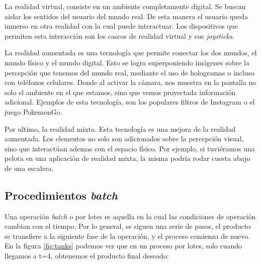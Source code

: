 
La realidad virtual, consiste en un ambiente completamente digital. Se buscan aislar los sentidos del usuario del mundo real. De esta manera el usuario queda inmerso en otra realidad con la cual puede interactuar. Los dispositivos que permiten esta interacción son los cascos de realidad virtual y sus \textit{joysticks}.

La realidad aumentada es una tecnología que permite conectar los dos mundos, el mundo físico y el mundo digital. Esto se logra superponiendo imágenes sobre la percepción que tenemos del mundo real, mediante el uso de hologramas o incluso con teléfonos celulares. Donde al activar la cámara, nos muestra en la pantalla no solo el ambiente en el que estamos, sino que vemos proyectada información adicional. Ejemplos de esta tecnología, son los populares filtros de Instagram o el juego PokemonGo.

Por ultimo, la realidad mixta. Esta tecnología es una mejora de la realidad aumentada. Los elementos no solo son adicionados sobre la percepción visual, sino que interactúan ademas con el espacio físico. Por ejemplo, si tuviéramos una pelota en una aplicación de realidad mixta, la misma podría rodar cuesta abajo de una escalera.


\subsection{Procedimientos \textit{batch}}

Una operación \textit{batch} o por lotes es aquella en la cual las condiciones de operación cambian con el tiempo. Por lo general, se siguen una serie de pasos, el producto se transfiere a la siguiente fase de la operación, y el proceso comienza de nuevo. En la figura \ref{fig:tanks} podemos ver que en un proceso por lotes, solo cuando llegamos a t=4, obtenemos el producto final deseado:\\

